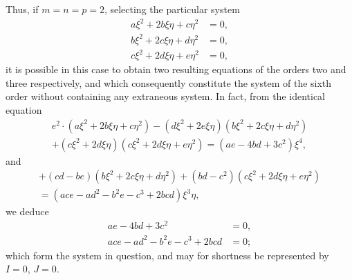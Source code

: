 \documentclass[11pt,a4paper]{book}
\begin{document}
Thus, if $m = n = p = 2$, selecting the particular system
\begin{align*}
a\xi^{2} + 2b\xi\eta + c\eta^{2} &= 0, \\
b\xi^{2} + 2c\xi\eta + d\eta^{2} &= 0, \\
c\xi^{2} + 2d\xi\eta + e\eta^{2} &= 0,
\end{align*}
it is possible in this case to obtain two resulting equations of the orders two and three respectively, and which consequently constitute the system of the sixth order without containing any extraneous system. In fact, from the identical equation
\begin{multline*}
e^{2} \cdot (a\xi^{2} + 2b\xi\eta + c\eta^{2}) - (d\xi^{2} + 2e\xi\eta)(b\xi^{2} + 2c\xi\eta + d\eta^{2}) \\
+ (c\xi^{2} + 2d\xi\eta)(c\xi^{2} + 2d\xi\eta + e\eta^{2}) = (ae - 4bd + 3c^{2})\xi^{4},
\end{multline*}
and
\begin{multline*}
+(cd - be)(b\xi^{2} + 2c\xi\eta + d\eta^{2}) + (bd - c^{2})(c\xi^{2} + 2d\xi\eta + e\eta^{2}) \\
= (ace - ad^{2} - b^{2}e - c^{3} + 2bcd)\xi^{3}\eta,
\end{multline*}
we deduce
\begin{align*}
ae - 4bd + 3c^{2} &= 0, \\
ace - ad^{2} - b^{2}e - c^{3} + 2bcd &= 0;
\end{align*}
which form the system in question, and may for shortness be represented by $I = 0$, $J = 0$.
\end{document}
